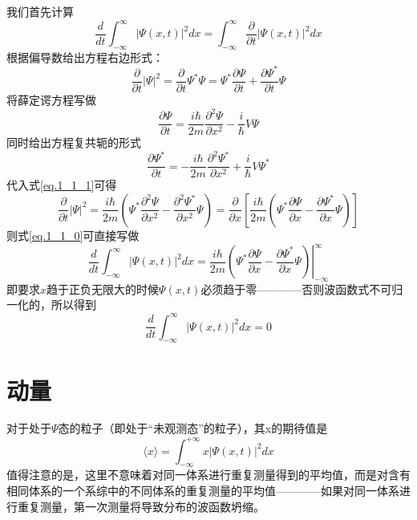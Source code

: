 		我们首先计算
		\begin{equation}
		\label{eq.1_1_0}
			\frac{d}{d t} \int_{-\infty}^{\infty}|\Psi(x, t)|^{2} d x=\int_{-\infty}^{\infty} \frac{\partial}{\partial t}|\Psi(x, t)|^{2} d x
		\end{equation}
		根据偏导数给出方程右边形式：
		\begin{equation}
		\label{eq.1_1_1}
			\frac{\partial}{\partial t}|\Psi|^{2}=\frac{\partial}{\partial t} \Psi^{*} \Psi=\Psi^{*} \frac{\partial \Psi}{\partial t}+\frac{\partial \Psi^{*}}{\partial t} \Psi
		\end{equation}
		将薛定谔方程写做
		\begin{equation}
			\frac{\partial \Psi}{\partial t}=\frac{i \hbar}{2 m} \frac{\partial^{2} \Psi}{\partial x^{2}}-\frac{i}{\hbar} V \Psi
		\end{equation}
		同时给出方程复共轭的形式
		\begin{equation}
			\frac{\partial \Psi^{*}}{\partial t}=-\frac{i \hbar}{2 m} \frac{\partial^{2} \Psi^{*}}{\partial x^{2}}+\frac{i}{\hbar} V \Psi^{*}
		\end{equation}
		代入式\ref{eq.1_1_1}可得
		\begin{equation}
		\label{eq.1_1_psi^2dt}
			\frac{\partial}{\partial t}|\Psi|^{2}=\frac{i \hbar}{2 m}\left(\Psi^{*} \frac{\partial^{2} \Psi}{\partial x^{2}}-\frac{\partial^{2} \Psi^{*}}{\partial x^{2}} \Psi\right)=\frac{\partial}{\partial x}\left[\frac{i \hbar}{2 m}\left(\Psi^{*} \frac{\partial \Psi}{\partial x}-\frac{\partial \Psi^{*}}{\partial x} \Psi\right)\right]
		\end{equation}
		则式\ref{eq.1_1_0}可直接写做
		\begin{equation}
			\frac{d}{d t} \int_{-\infty}^{\infty}|\Psi(x, t)|^{2} d x=\left.\frac{i \hbar}{2 m}\left(\Psi^{*} \frac{\partial \Psi}{\partial x}-\frac{\partial \Psi^{*}}{\partial x} \Psi\right)\right|_{-\infty} ^{\infty}
		\end{equation}
		即要求$x$趋于正负无限大的时候$\Psi (x,t)$必须趋于零————否则波函数式不可归一化的，所以得到
		\begin{equation}
			\frac{d}{d t} \int_{-\infty}^{\infty}|\Psi(x, t)|^{2} d x=0
		\end{equation}
	\section{动量}
		对于处于$\Psi$态的粒子（即处于“未观测态”的粒子），其x的期待值是
		\begin{equation}
		\label{eq.<x>}
		\langle x \rangle = \int_{-\infty}^{+\infty}x|\Psi (x,t)|^2 d x
		\end{equation}
		值得注意的是，这里不意味着对同一体系进行重复测量得到的平均值，而是对含有相同体系的一个系综中的不同体系的重复测量的平均值————如果对同一体系进行重复测量，第一次测量将导致分布的波函数坍缩。


